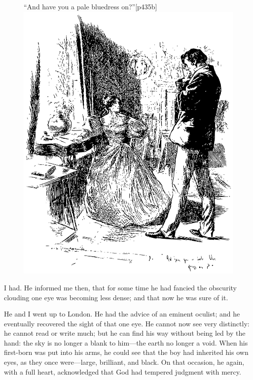\begin{figure}
	\begin{sidecaption}{\enquote{And have you a pale blue\linebreak dress on?}}[p435b]
		\centering
		\includegraphics[width=\linewidth]{images/p435b.pdf}
	\end{sidecaption}
\end{figure}

I had. He informed me then, that for some time he had fancied the
obscurity clouding one eye was becoming less dense; and that now he was
sure of it.

He and I went up to London. He had the advice of an eminent oculist;
and he eventually recovered the sight of that one eye. He cannot now
see very distinctly: he cannot read or write much; but he can find his
way without being led by the hand: the sky is no longer a blank to
him---the earth no longer a void. When his first-born was put into his
arms, he could see that the boy had inherited his own eyes, as they once
were---large, brilliant, and black. On that occasion, he again, with a
full heart, acknowledged that God had tempered judgment with mercy.

